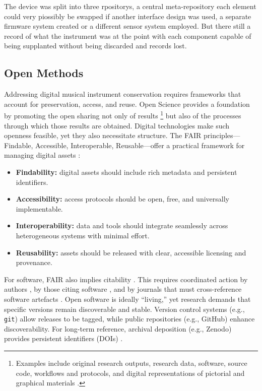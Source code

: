 The device was split into three rpositorys, a central meta-repository
each element could very piossibly be swapped if another interface design was used, a separate firmware system created or a different sensor system employed. But there still a record of what the instrument was at the point with each component capable of being supplanted without being discarded and records lost.


\subsection{Open Methods}\label{sec:open-methods}

Addressing digital musical instrument conservation requires frameworks that
account for preservation, access, and reuse. Open Science
\cite{unesco_open_2021} provides a foundation by promoting the open sharing not
only of results%
\footnote{Examples include original research outputs, research data, software,
    source code, workflows and protocols, and digital representations of pictorial
    and graphical materials \cite{unesco_open_2021}.} but also of the processes
through which those results are obtained. Digital technologies make such
openness feasible, yet they also necessitate structure. The FAIR
principles---Findable, Accessible, Interoperable, Reusable---offer a practical
framework for managing digital assets \cite{wilkinson_fair_2016}:

\begin{itemize}
    \item \textbf{Findability:} digital assets should include rich metadata and
          persistent identifiers.
    \item \textbf{Accessibility:} access protocols should be open, free, and
          universally implementable.
    \item \textbf{Interoperability:} data and tools should integrate seamlessly
          across heterogeneous systems with minimal effort.
    \item \textbf{Reusability:} assets should be released with clear, accessible
          licensing and provenance.
\end{itemize}

For software, FAIR also implies citability \cite{soito_citations_2016}. This
requires coordinated action by authors \cite{smith_software_2016}, by those
citing software \cite{katz_recognizing_2021}, and by journals that must
cross-reference software artefacts \cite{stall_journal_2023}. Open software is
ideally ``living,'' yet research demands that specific versions remain
discoverable and stable. Version control systems (e.g., \texttt{git}) allow
releases to be tagged, while public repositories (e.g., GitHub) enhance
discoverability. For long-term reference, archival deposition (e.g., Zenodo)
provides persistent identifiers (DOIs) \cite{smith_software_2016,
    stall_journal_2023}.


